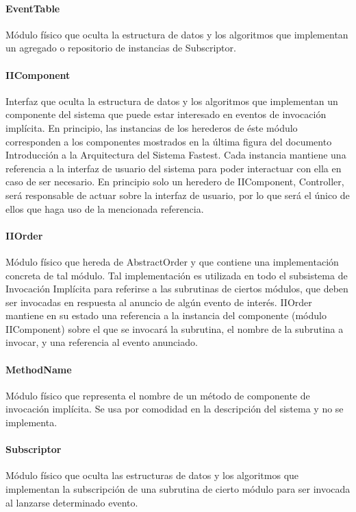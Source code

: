 \documentclass[a4paper,10pt]{report}
\begin{document}
				\paragraph{EventTable}
				Módulo físico que oculta la estructura de datos y los algoritmos que implementan un agregado o repositorio de instancias de Subscriptor.
				\paragraph{IIComponent}
				Interfaz que oculta la estructura de datos y los algoritmos que implementan un componente del sistema que puede estar interesado en eventos de invocación implícita. En principio, las instancias de los herederos de éste módulo corresponden a los componentes mostrados en la última figura del documento Introducción a la Arquitectura del Sistema Fastest. Cada instancia mantiene una referencia a la interfaz de usuario del sistema para poder interactuar con ella en caso de ser necesario. En principio solo un heredero de IIComponent, Controller, será responsable de actuar sobre la interfaz de usuario, por lo que será el único de ellos que haga uso de la mencionada referencia.
				\paragraph{IIOrder}
				Módulo físico que hereda de AbstractOrder y que contiene una implementación concreta de tal módulo. Tal implementación es utilizada en todo el subsistema de Invocación Implícita para referirse a las subrutinas de ciertos módulos, que deben ser invocadas en respuesta al anuncio de algún evento de interés. IIOrder mantiene en su estado una referencia a la instancia del componente (módulo IIComponent) sobre el que se invocará la subrutina, el nombre de la subrutina a invocar, y una referencia al evento anunciado.
				\paragraph{MethodName}
				Módulo físico que representa el nombre de un método de componente de invocación implícita. Se usa por comodidad en la descripción del sistema y no se implementa.
				\paragraph{Subscriptor}
				Módulo físico que oculta las estructuras de datos y los algoritmos que implementan la subscripción de una subrutina de cierto módulo para ser invocada al lanzarse determinado evento.
\end{document}
